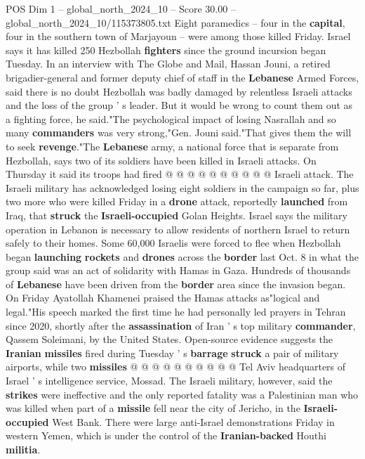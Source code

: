 \begin{textsample}{POS Dim 1 – global\_north\_2024\_10 – Score 30.00 – global\_north\_2024\_10/115373805.txt}
Eight paramedics -- four in the \textbf{capital}, four in the southern town of Marjayoun -- were among those killed Friday.
Israel says it has killed 250 Hezbollah \textbf{fighters} since the ground incursion began Tuesday.
In an interview with The Globe and Mail, Hassan Jouni, a retired brigadier-general and former deputy chief of staff in the \textbf{Lebanese} Armed Forces, said there is no doubt Hezbollah was badly damaged by relentless Israeli attacks and the loss of the group ' s leader.
But it would be wrong to count them out as a fighting force, he said."The psychological impact of losing Nasrallah and so many \textbf{commanders} was very strong,"Gen.
Jouni said."That gives them the will to seek \textbf{revenge}."The \textbf{Lebanese} army, a national force that is separate from Hezbollah, says two of its soldiers have been killed in Israeli attacks.
On Thursday it said its troops had fired @ @ @ @ @ @ @ @ @ @ Israeli attack.
The Israeli military has acknowledged losing eight soldiers in the campaign so far, plus two more who were killed Friday in a \textbf{drone} attack, reportedly \textbf{launched} from Iraq, that \textbf{struck} the \textbf{Israeli-occupied} Golan Heights.
Israel says the military operation in Lebanon is necessary to allow residents of northern Israel to return safely to their homes.
Some 60,000 Israelis were forced to flee when Hezbollah began \textbf{launching} \textbf{rockets} and \textbf{drones} across the \textbf{border} last Oct. 8 in what the group said was an act of solidarity with Hamas in Gaza.
Hundreds of thousands of \textbf{Lebanese} have been driven from the \textbf{border} area since the invasion began.
On Friday Ayatollah Khamenei praised the Hamas attacks as"logical and legal."His speech marked the first time he had personally led prayers in Tehran since 2020, shortly after the \textbf{assassination} of Iran ' s top military \textbf{commander}, Qassem Soleimani, by the United States.
Open-source evidence suggests the \textbf{Iranian} \textbf{missiles} fired during Tuesday ' s \textbf{barrage} \textbf{struck} a pair of military airports, while two \textbf{missiles} @ @ @ @ @ @ @ @ @ @ Tel Aviv headquarters of Israel ' s intelligence service, Mossad.
The Israeli military, however, said the \textbf{strikes} were ineffective and the only reported fatality was a Palestinian man who was killed when part of a \textbf{missile} fell near the city of Jericho, in the \textbf{Israeli-occupied} West Bank.
There were large anti-Israel demonstrations Friday in western Yemen, which is under the control of the \textbf{Iranian-backed} Houthi \textbf{militia}.

\end{textsample}
